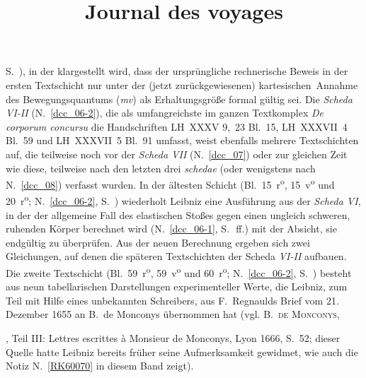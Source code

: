 S.~), in der klargestellt wird, dass der ursprüngliche rechnerische Beweis in der ersten Textschicht nur unter der (jetzt zurückgewiesenen) \glqq kartesischen\grqq\ Annahme des Bewegungsquantums (\textit{mv}) als Erhaltungsgröße formal gültig sei.%
\pend%
%
\pstart%
Die%
\textit{Scheda VI-II} (N.~\ref{dcc_06-2}), %
die als umfangreichste im ganzen Textkomplex \textit{De corporum concursu} die Handschriften LH~XXXV 9,~23 Bl.~15, LH~XXXVII~4 Bl.~59 und LH~XXXVII~5 Bl.~91 umfasst, weist ebenfalls mehrere Textschichten auf, die teilweise noch vor der \textit{Scheda VII} (N.~\ref{dcc_07}) %
oder zur gleichen Zeit wie diese, teilweise nach den letzten drei \textit{schedae} (oder wenigstens nach N.~\ref{dcc_08}) %
verfasst wurden.
In der ältesten Schicht (Bl.~15~r\textsuperscript{o}, 15~v\textsuperscript{o} und 20~r\textsuperscript{o}; N.~\ref{dcc_06-2}, %
S.~) wiederholt Leibniz eine Ausführung aus der \textit{Scheda VI}, in der der allgemeine Fall des elastischen Stoßes gegen einen ungleich schweren, ruhenden Körper berechnet wird (N.~\ref{dcc_06-1}, %
S.~\,ff.) mit der Absicht, sie endgültig zu überprüfen.
Aus der neuen Berechnung ergeben sich zwei Gleichungen, auf denen die späteren Textschichten der Scheda \textit{VI-II} aufbauen.
Die zweite Textschicht (Bl.~59~r\textsuperscript{o}, 59~v\textsuperscript{o} und 60~r\textsuperscript{o}; N.~\ref{dcc_06-2}, %
S.~\pageref{37_04_059r_Regnauld_Anfang}\textendash\pageref{37_04_060r_Regnauld_Ende}) besteht aus neun tabellarischen Darstellungen experimenteller Werte, die Leibniz, zum Teil mit Hilfe eines unbekannten Schreibers, aus F.~Regnaulds%
\protect{}
Brief vom 21. Dezember 1655 an B.~de Monconys%
\protect{}
übernommen hat (vgl. \cite{02021}B.~\textsc{de Monconys},
\cite{00118}\title{Journal des voyages},
Teil III: \glqq Lettres escrittes à Monsieur de Monconys\grqq,
Lyon 1666, S.~52; %
dieser Quelle hatte Leibniz bereits früher seine Aufmerksamkeit gewidmet, wie auch die Notiz N.~\ref{RK60070} in diesem Band zeigt).
